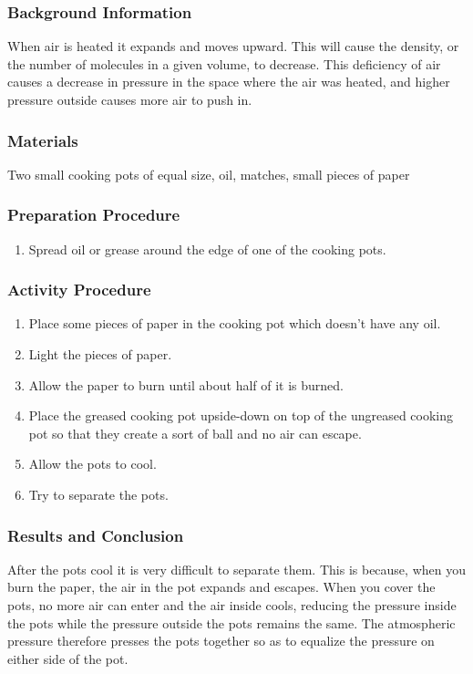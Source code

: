 \subsubsection*{Background Information}
When air is heated it expands and moves upward.  This will cause the density, or the number of molecules in a given volume, to decrease.  This deficiency of air causes a decrease in pressure in the space where the air was heated, and higher pressure outside causes more air to push in.

\subsubsection*{Materials}
Two small cooking pots of equal size, oil, matches, small pieces of paper

\subsubsection*{Preparation Procedure}
\begin{enumerate}
\item{Spread oil or grease around the edge of one of the cooking pots.} 
\end{enumerate}

\subsubsection*{Activity Procedure}
\begin{enumerate}
\item{Place some pieces of paper in the cooking pot which doesn't have any oil.} 
\item{Light the pieces of paper.} 
\item{Allow the paper to burn until about half of it is burned.} 
\item{Place the greased cooking pot upside-down on top of the ungreased cooking pot so that they create a sort of ball and no air can escape.} 
\item{Allow the pots to cool.} 
\item{Try to separate the pots.} 
\end{enumerate}

\subsubsection*{Results and Conclusion}
After the pots cool it is very difficult to separate them. This is because, when you burn the paper, the air in the pot expands and escapes. When you cover the pots, no more air can enter and the air inside cools, reducing the pressure inside the pots while the pressure outside the pots remains the same. The atmospheric pressure therefore presses the pots together so as to equalize the pressure on either side of the pot.  


